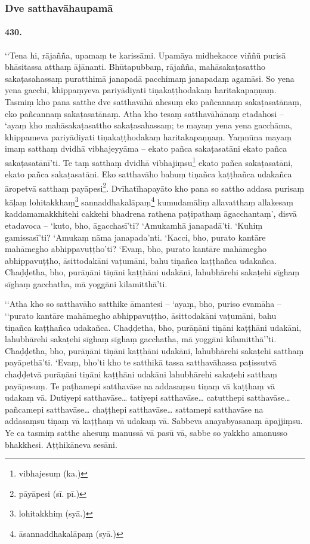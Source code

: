 \subsubsection{Dve satthavāhaupamā}

\paragraph{430.} ‘‘Tena hi, rājañña, upamaṃ te karissāmi. Upamāya midhekacce viññū purisā bhāsitassa atthaṃ ājānanti. Bhūtapubbaṃ, rājañña, mahāsakaṭasattho sakaṭasahassaṃ puratthimā janapadā pacchimaṃ janapadaṃ agamāsi. So yena yena gacchi, khippaṃyeva pariyādiyati tiṇakaṭṭhodakaṃ haritakapaṇṇaṃ. Tasmiṃ kho pana satthe dve satthavāhā ahesuṃ eko pañcannaṃ sakaṭasatānaṃ, eko pañcannaṃ sakaṭasatānaṃ. Atha kho tesaṃ satthavāhānaṃ etadahosi – ‘ayaṃ kho mahāsakaṭasattho sakaṭasahassaṃ; te mayaṃ yena yena gacchāma, khippameva pariyādiyati tiṇakaṭṭhodakaṃ haritakapaṇṇaṃ. Yaṃnūna mayaṃ imaṃ satthaṃ dvidhā vibhajeyyāma – ekato pañca sakaṭasatāni ekato pañca sakaṭasatānī’ti. Te taṃ satthaṃ dvidhā vibhajiṃsu\footnote{vibhajesuṃ (ka.)} ekato pañca sakaṭasatāni, ekato pañca sakaṭasatāni. Eko satthavāho bahuṃ tiṇañca kaṭṭhañca udakañca āropetvā satthaṃ payāpesi\footnote{pāyāpesi (sī. pī.)}. Dvīhatīhapayāto kho pana so sattho addasa purisaṃ kāḷaṃ lohitakkhaṃ\footnote{lohitakkhiṃ (syā.)} sannaddhakalāpaṃ\footnote{āsannaddhakalāpaṃ (syā.)} kumudamāliṃ allavatthaṃ allakesaṃ kaddamamakkhitehi cakkehi bhadrena rathena paṭipathaṃ āgacchantaṃ’, disvā etadavoca – ‘kuto, bho, āgacchasī’ti? ‘Amukamhā janapadā’ti. ‘Kuhiṃ gamissasī’ti? ‘Amukaṃ nāma janapada’nti. ‘Kacci, bho, purato kantāre mahāmegho abhippavuṭṭho’ti? ‘Evaṃ, bho, purato kantāre mahāmegho abhippavuṭṭho, āsittodakāni vaṭumāni, bahu tiṇañca kaṭṭhañca udakañca. Chaḍḍetha, bho, purāṇāni tiṇāni kaṭṭhāni udakāni, lahubhārehi sakaṭehi sīghaṃ sīghaṃ gacchatha, mā yoggāni kilamitthā’ti.

‘‘Atha kho so satthavāho satthike āmantesi – ‘ayaṃ, bho, puriso evamāha – ‘‘purato kantāre mahāmegho abhippavuṭṭho, āsittodakāni vaṭumāni, bahu tiṇañca kaṭṭhañca udakañca. Chaḍḍetha, bho, purāṇāni tiṇāni kaṭṭhāni udakāni, lahubhārehi sakaṭehi sīghaṃ sīghaṃ gacchatha, mā yoggāni kilamitthā’’ti. Chaḍḍetha, bho, purāṇāni tiṇāni kaṭṭhāni udakāni, lahubhārehi sakaṭehi satthaṃ payāpethā’ti. ‘Evaṃ, bho’ti kho te satthikā tassa satthavāhassa paṭissutvā chaḍḍetvā purāṇāni tiṇāni kaṭṭhāni udakāni lahubhārehi sakaṭehi satthaṃ payāpesuṃ. Te paṭhamepi satthavāse na addasaṃsu tiṇaṃ vā kaṭṭhaṃ vā udakaṃ vā. Dutiyepi satthavāse… tatiyepi satthavāse… catutthepi satthavāse… pañcamepi satthavāse… chaṭṭhepi satthavāse… sattamepi satthavāse na addasaṃsu tiṇaṃ vā kaṭṭhaṃ vā udakaṃ vā. Sabbeva anayabyasanaṃ āpajjiṃsu. Ye ca tasmiṃ satthe ahesuṃ manussā vā pasū vā, sabbe so yakkho amanusso bhakkhesi. Aṭṭhikāneva sesāni.

